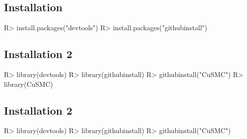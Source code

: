 \documentclass[
]{jss}
\begin{document}
\hypertarget{installation}{%
\subsection{Installation}\label{installation}}

\begin{CodeChunk}

\begin{CodeInput}
R> install.packages("devtools")
R> install.packages("githubinstall")
\end{CodeInput}
\end{CodeChunk}

\hypertarget{installation-2}{%
\subsection{Installation 2}\label{installation-2}}

\begin{CodeChunk}

\begin{CodeInput}
R> library(devtools)
R> library(githubinstall)
R> githubinstall("CuSMC")
R> library(CuSMC)
\end{CodeInput}
\end{CodeChunk}

\hypertarget{installation-2-1}{%
\subsection{Installation 2}\label{installation-2-1}}

\begin{CodeChunk}

\begin{CodeInput}
R> library(devtools)
R> library(githubinstall)
R> githubinstall("CuSMC")
\end{CodeInput}
\end{CodeChunk}
\end{document}
